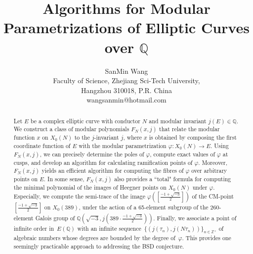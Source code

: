 \documentclass[10pt, a4paper]{article}
\begin{document}
\renewcommand{\algorithmicrequire}{ Input:}
\renewcommand{\algorithmicensure}{Output:}
\makeatletter
\title{Algorithms for Modular Parametrizations of Elliptic Curves over $\mathbb{Q}$}

\author{SanMin Wang\\
 Faculty of Science, Zhejiang Sci-Tech University, \\
Hangzhou 310018, P.R. China\\
wangsanmin@hotmail.com}





\maketitle

\begin{abstract}
Let \( E \) be a complex elliptic curve with conductor \( N \) and   modular invariant \( j(E) \in \mathbb{Q} \). We construct a class of modular polynomials $F_N(x,j)$ that relate  the modular function $x$ on $X_0(N)$ to the $j$-invariant $j$, where $x$ is  obtained by composing  the first coordinate function of $E$ with
the modular parametrization $\varphi: X_0(N) \rightarrow E$.
Using $F_N(x,j)$,  we can precisely determine the poles of $\varphi$,
compute exact values of $\varphi$ at cusps,  and
develop an algorithm for calculating ramification points of $\varphi$.
Moreover, $F_N(x,j)$ yields   an efficient algorithm for computing  the fibres of $\varphi$
over arbitrary points on $E$.
In some sense, $F_N(x,j)$  also provides   a ``total"  formula for computing the minimal polynomial of
the images of  Heegner points on $X_0(N)$ under $\varphi$.
Especially, we  compute  the semi-trace of the image $\varphi ([\frac{{ - 1 + \sqrt { - 3} }}{2}])$  of  the  CM-point   $[\frac{-1 + \sqrt{-3}}{2}]$ on  $X_{0}(389)$,  under the action of a 65-element subgroup of the 260-element  Galois group of  $\mathbb{Q}(\sqrt{-3}, j(389 \cdot \frac{-1 + \sqrt{-3}}{2}))$. Finally,  we associate a point of infinite order in~\( E(\mathbb{Q}) \) with an infinite sequence~$\{ (j(\tau_n), j(N\tau_n)) \}_{n \in \mathbb{Z}^+} $ of algebraic numbers whose degrees are bounded by the degree of~$\varphi$. This provides one seemingly  practicable  approach to addressing  the BSD conjecture.

\end{abstract}
\end{document}
